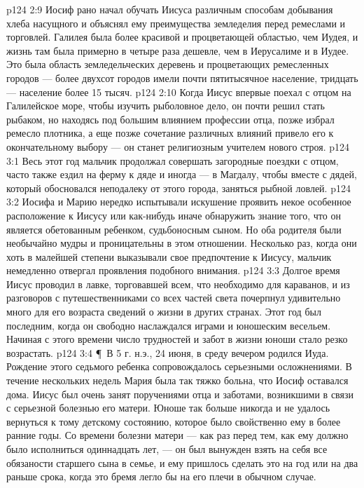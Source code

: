 \vs p124 2:9 Иосиф рано начал обучать Иисуса различным способам добывания хлеба насущного и объяснял ему преимущества земледелия перед ремеслами и торговлей. Галилея была более красивой и процветающей областью, чем Иудея, и жизнь там была примерно в четыре раза дешевле, чем в Иерусалиме и в Иудее. Это была область земледельческих деревень и процветающих ремесленных городов --- более двухсот городов имели почти пятитысячное население, тридцать --- население более 15 тысяч.
\vs p124 2:10 Когда Иисус впервые поехал с отцом на Галилейское море, чтобы изучить рыболовное дело, он почти решил стать рыбаком, но находясь под большим влиянием профессии отца, позже избрал ремесло плотника, а еще позже сочетание различных влияний привело его к окончательному выбору --- он станет религиозным учителем нового строя.
\vs p124 3:1 Весь этот год мальчик продолжал совершать загородные поездки с отцом, часто также ездил на ферму к дяде и иногда --- в Магдалу, чтобы вместе с дядей, который обосновался неподалеку от этого города, заняться рыбной ловлей.
\vs p124 3:2 Иосифа и Марию нередко испытывали искушение проявить некое особенное расположение к Иисусу или как\hyp{}нибудь иначе обнаружить знание того, что он является обетованным ребенком, судьбоносным сыном. Но оба родителя были необычайно мудры и проницательны в этом отношении. Несколько раз, когда они хоть в малейшей степени выказывали свое предпочтение к Иисусу, мальчик немедленно отвергал проявления подобного внимания.
\vs p124 3:3 Долгое время Иисус проводил в лавке, торговавшей всем, что необходимо для караванов, и из разговоров с путешественниками со всех частей света почерпнул удивительно много для его возраста сведений о жизни в других странах. Этот год был последним, когда он свободно наслаждался играми и юношеским весельем. Начиная с этого времени число трудностей и забот в жизни юноши стало резко возрастать.
\vs p124 3:4 \P\ В 5 г. н.э., 24 июня, в среду вечером родился Иуда. Рождение этого седьмого ребенка сопровождалось серьезными осложнениями. В течение нескольких недель Мария была так тяжко больна, что Иосиф оставался дома. Иисус был очень занят поручениями отца и заботами, возникшими в связи с серьезной болезнью его матери. Юноше так больше никогда и не удалось вернуться к тому детскому состоянию, которое было свойственно ему в более ранние годы. Со времени болезни матери --- как раз перед тем, как ему должно было исполниться одиннадцать лет, --- он был вынужден взять на себя все обязаности старшего сына в семье, и ему пришлось сделать это на год или на два раньше срока, когда это бремя легло бы на его плечи в обычном случае.

